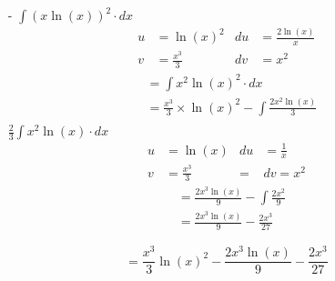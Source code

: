 \documentclass{report}
\begin{document}
  \newpage

  \begin{itemize}
    \item[-] $\displaystyle{\int (x \ln(x))^2 \cdot dx}$
      \begin{align*}
        u & = \ln(x)^2 & du & = \frac{2\ln(x)}{x}\\
        v & = \frac{x^3}{3} & dv & = x^2
      \end{align*}
      \begin{align*}
        & = \int x^2 \ln(x)^2 \cdot dx\\
        & = \frac{x^3}{3} \times \ln(x)^2 - \int \frac{2x^2 \ln(x)}{3}\\
      \end{align*}
      $\displaystyle{\frac{2}{3}\int x^2 \ln(x) \cdot dx}$
      \begin{align*}
        u & = \ln(x) & du & = \frac{1}{x}\\
        v & = \frac{x^3}{3} & = & dv = x^2
      \end{align*}
      \begin{align*}
        & = \frac{2x^3 \ln(x)}{9} - \int \frac{2x^2}{9}\\
        & = \frac{2x^3 \ln(x)}{9} - \frac{2x^3}{27}
      \end{align*}

      \[= \frac{x^3}{3} \ln(x)^2 - \frac{2x^3 \ln(x)}{9} - \frac{2x^3}{27}\]

  \end{itemize}
\end{document}
